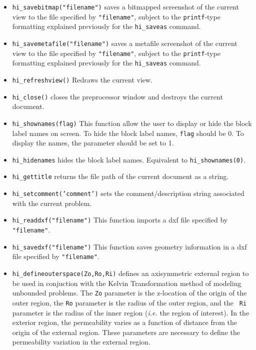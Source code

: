 \begin{itemize}
\item \texttt{hi\_savebitmap("filename")} saves a bitmapped screenshot of the current
view to the file specified by \texttt{"filename"}, subject to the
\texttt{printf}-type formatting explained previously for the
\texttt{hi\_saveas} command.

\item \texttt{hi\_savemetafile("filename")} saves a metafile screenshot of the current
view to the file specified by \texttt{"filename"}, subject to the
\texttt{printf}-type formatting explained previously for the
\texttt{hi\_saveas} command.

\item \texttt{hi\_refreshview()} Redraws the current view.

\item \texttt{hi\_close()} closes the preprocessor window and
destroys the current document.

\item \texttt{hi\_shownames(flag)} This function allow the user to display or hide the
block label names on screen. To hide the block label names,
\texttt{flag} should be 0. To display the names, the parameter
should be set to 1.

\item{\tt hi\_hidenames} hides the block label names. Equivalent to {\tt hi\_shownames(0)}.

\item{\tt hi\_gettitle} returns the file path of the current document as a string.

\item{\tt hi\_setcomment('comment')} sets the comment/description string associated with the current problem.

\item{\tt hi\_readdxf("filename")} This function imports a dxf file specified by {\tt "filename"}.

\item{\tt hi\_savedxf("filename")} This function saves geometry information in a dxf file specified by {\tt "filename"}.

\item{\tt hi\_defineouterspace(Zo,Ro,Ri)} defines
an axisymmetric external region to be used in conjuction with the
Kelvin Transformation method of modeling unbounded problems.  The
{\tt Zo} parameter is the z-location of the origin of the outer region,
the {\tt Ro} parameter is the radius of the outer region, and the {\tt
Ri} parameter is the radius of the inner region ({\em i.e.} the region of
interest). In the exterior region, the permeability varies as a function of
distance from the origin of the external region.  These parameters
are necessary to define the permeability variation in the external
region.


\end{itemize}
